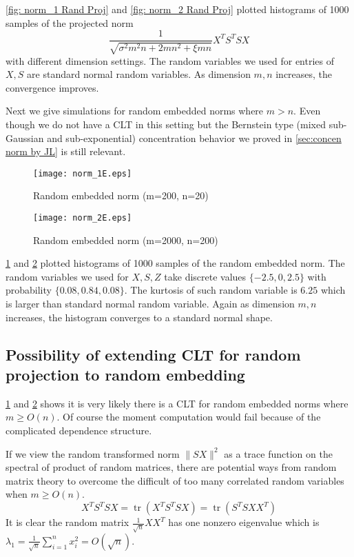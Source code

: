 \documentclass[12pt]{extarticle}
\newcommand{\1}{\field{1}}
\DeclareMathOperator{\tr}{tr}
\numberwithin{equation}{section}
\begin{document}
\cref{fig: norm_1 Rand Proj} and \cref{fig: norm_2 Rand Proj} plotted histograms of 1000 samples of the projected norm
\[
\frac{1}{\sqrt{\sigma^2 m^2n+2mn^2+ \xi mn}} X^TS^TSX
\]
with different dimension settings. The random variables we used for entries of $X, S$ are standard normal random variables. As dimension $m, n$ increases, the convergence improves.

Next we give simulations for random embedded norms where $m> n$. Even though we do not have a CLT in this setting but the Bernstein type (mixed sub-Gaussian and sub-exponential) concentration behavior we proved in \cref{sec:concen norm by JL} is still relevant.
\begin{figure}[!ht]
	\texttt{[image: norm\_1E.eps]}
	\caption{Random embedded norm (m=200, n=20)}
	\label{fig: norm_1E Rand Proj}
\end{figure}
\begin{figure}[!ht]
    \texttt{[image: norm\_2E.eps]}
    \caption{Random embedded norm (m=2000, n=200)}
    \label{fig: norm_2E Rand Proj}
\end{figure}

\cref{fig: norm_1E Rand Proj} and \cref{fig: norm_2E Rand Proj} 
plotted histograms of 1000 samples of the random embedded norm. The random variables we used for $X, S, Z$  take discrete values $\{-2.5, 0, 2.5\}$ with probability $\{0.08, 0.84, 0.08\}$. The kurtosis of such random variable is $6.25$ which is larger than standard normal random variable. Again as dimension $m, n$ increases, the histogram converges to a standard normal shape.



\subsection{Possibility of extending CLT for random projection to random embedding}
\cref{fig: norm_1E Rand Proj} and \cref{fig: norm_2E Rand Proj} shows it is very likely there is a CLT for random embedded norms where $m\ge O(n)$. Of course the moment computation would fail because of the complicated dependence structure.

If we view the random transformed norm $\|SX\|^2$ as a trace function on the spectral of product of random matrices, there are potential ways from random matrix theory to overcome the difficult of too many correlated random variables when $m\ge O(n)$.
\[
X^TS^TSX = \tr(X^TS^TSX) =\tr(S^TSXX^T) 
\]
It is clear the random matrix $\frac{1}{\sqrt{n}} XX^T$ has one nonzero eigenvalue which is $\lambda_1 = \frac{1}{\sqrt{n}}\sum_{i=1}^n x_i^2 = O(\sqrt{n})$. 
\end{document}
